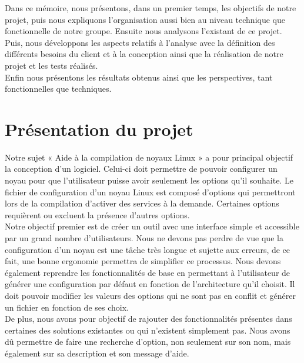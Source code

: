 \documentclass[16pts]{report}
\begin{document}
Dans ce mémoire, nous présentons, dans un premier temps, les objectifs de 
notre projet, puis nous expliquons l’organisation aussi bien au niveau 
technique que fonctionnelle de notre groupe. Ensuite nous analysons l'existant 
de ce projet.
\\

Puis, nous développons les aspects relatifs à l’analyse avec la définition 
des différents besoins du client et à la conception ainsi que la réalisation 
de notre projet et les tests réalisés.
\\

Enfin nous présentons les résultats obtenus ainsi que les perspectives, 
tant fonctionnelles que techniques.


\chapter{Présentation du projet}
\label{cha:Présentation du projet}

Notre sujet « Aide à la compilation de noyaux Linux » a pour principal 
objectif la conception d'un logiciel. Celui-ci doit permettre de pouvoir 
configurer un noyau pour que l'utilisateur puisse avoir seulement les 
options qu'il souhaite. Le fichier de configuration d'un noyau Linux est composé
d'options qui permettront lors de la compilation d'activer des services à la
demande.  Certaines options requièrent ou excluent la présence d'autres options.
\\

Notre objectif premier est de créer un outil avec une interface simple et 
accessible par un grand nombre d'utilisateurs. Nous ne devons pas perdre 
de vue que la configuration d'un noyau est une tâche très longue et 
sujette aux erreurs, de ce fait, une bonne ergonomie permettra de 
simplifier ce processus. Nous devons également reprendre les fonctionnalités 
de base en permettant à l'utilisateur de générer une configuration par 
défaut en fonction de l'architecture qu'il choisit. Il doit pouvoir 
modifier les valeurs des options qui ne sont pas en conflit et générer 
un fichier en fonction de ses choix.
\\

De plus, nous avons pour objectif de rajouter des fonctionnalités présentes 
dans certaines des solutions existantes ou qui n'existent simplement pas. 
Nous avons dû permettre de faire une recherche d'option, non seulement 
sur son nom, mais également sur sa description et son message d'aide.
\\
\end{document}
